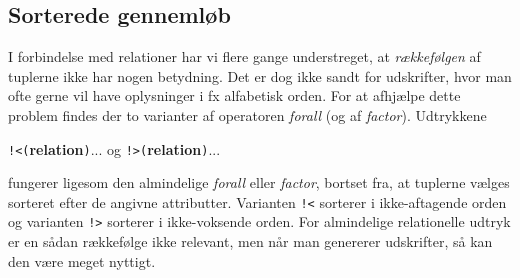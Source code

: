 
\subsection{Sorterede genneml\o{}b}
I forbindelse med relationer har vi flere gange understreget, at
{\em r\ae{}kkef\o{}lgen\/} af tuplerne ikke har nogen betydning. Det er dog
ikke sandt for udskrifter, hvor man ofte gerne vil have oplysninger
i fx alfabetisk orden. For at afhj\ae{}lpe dette problem findes der
to varianter af operatoren {\em forall\/} (og af {\em factor}).
Udtrykkene 
\begin{center}
\verb"!<("{\bf relation}\verb")"... og \verb"!>("{\bf relation}\verb")"...
\end{center}
fungerer ligesom den almindelige {\em forall\/} eller {\em factor},
bortset fra, at tup\-lerne v\ae{}lges sorteret efter de angivne attributter.
Varianten \verb"!<" sorterer i ikke-aftagende orden og varianten
\verb"!>" sorterer i ikke-voksende orden. For almindelige relationelle
udtryk er en s\aa{}dan r\ae{}kkef\o{}lge ikke relevant, men n\aa{}r man genererer udskrifter,
s\aa{} kan den v\ae{}re meget nyttigt.


